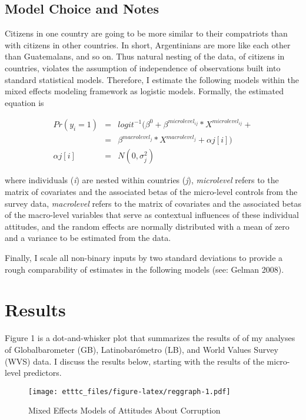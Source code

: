 \documentclass[11pt,]{article}
\begin{document}
\subsection{Model Choice and Notes}\label{model-choice-and-notes}

Citizens in one country are going to be more similar to their
compatriots than with citizens in other countries. In short,
Argentinians are more like each other than Guatemalans, and so on. Thus
natural nesting of the data, of citizens in countries, violates the
assumption of independence of observations built into standard
statistical models. Therefore, I estimate the following models within
the mixed effects modeling framework as logistic models. Formally, the
estimated equation is

\begin{eqnarray}
Pr(y_{i} = 1)  &=& logit^{-1}(\beta^{0} + \beta^{microlevel_{ij}}*X^{microlevel_{ij}} +  \nonumber \\
               &=&  \beta^{macrolevel_{j}}*X^{macrolevel_{j}} + \alpha{j[i]})  \nonumber \\
\alpha{j[i]}   &=& N(0, \sigma^{2}_{j})              
\end{eqnarray}

where individuals (\emph{i}) are nested within countries (\emph{j}),
\emph{microlevel} refers to the matrix of covariates and the associated
betas of the micro-level controls from the survey data,
\emph{macrolevel} refers to the matrix of covariates and the associated
betas of the macro-level variables that serve as contextual influences
of these individual attitudes, and the random effects are normally
distributed with a mean of zero and a variance to be estimated from the
data.

Finally, I scale all non-binary inputs by two standard deviations to
provide a rough comparability of estimates in the following models (see:
Gelman 2008).

\section{Results}\label{results}

Figure 1 is a dot-and-whisker plot that summarizes the results of of my
analyses of Globalbarometer (GB), Latinobarómetro (LB), and World Values
Survey (WVS) data. I discuss the results below, starting with the
results of the micro-level predictors.

\begin{figure}[htbp]
\centering
\texttt{[image: etttc\_files/figure-latex/reggraph-1.pdf]}
\caption{Mixed Effects Models of Attitudes About Corruption}
\end{figure}
\end{document}
